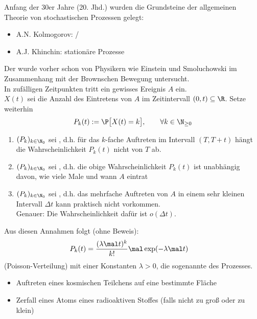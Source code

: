 Anfang der 30er Jahre (20. Jhd.) wurden die 
Grundsteine der allgemeinen Theorie von stochastischen Prozessen gelegt:
\begin{itemize}
	\item A.N. Kolmogorov:  / 
	\item A.J. Khinchin: stationäre Prozesse 
\end{itemize}

\begin{beisp}\enter
	Der  wurde vorher schon von Physikern wie Einstein und Smoluchowski im Zusammenhang mit der Brownschen Bewegung untersucht.\\
	In zufälligen Zeitpunkten tritt ein gewisses Ereignis $A$ ein.\\
	$X(t)$ sei die Anzahl des Eintretens von $A$ im Zeitintervall $(0,t)\subseteq\R$.
	Setze weiterhin
	\begin{align*}
		P_k(t):=\P\big[X(t)=k\big],\qquad\forall k\in\N_{\geq0}
	\end{align*}
	\begin{enumerate}
		\item $(P_k)_{k\in\N_0}$ sei , d.h. für das $k$-fache Auftreten im Intervall $(T,T+t)$ hängt die Wahrscheinlichkeit $P_k(t)$ nicht von $T$ ab.
		\item $(P_k)_{k\in\N_0}$ sei , d.h. die obige Wahrscheinlichkeit $P_k(t)$ ist unabhängig davon, wie viele Male und wann $A$  eintrat
		\item $(P_k)_{k\in\N_0}$ sei , d.h. das mehrfache Auftreten von $A$ in einem sehr kleinen Intervall $\Delta t$ kann praktisch nicht vorkommen.\\
		Genauer:
		Die Wahrscheinlichkeit dafür ist $o(\Delta t)$.
	\end{enumerate}
	 Aus diesen Annahmen folgt (ohne Beweis):
	 \begin{align*}
	 	P_k(t)&=\frac{(\lambda\mal t)^k}{k!}\mal\exp(-\lambda\mal t)
	 \end{align*}
	 (Poisson-Verteilung) mit einer Konstanten $\lambda>0$, die sogenannte  des Prozesses.\nl
	 \begin{itemize}
	 	\item Auftreten eines kosmischen Teilchens auf eine  bestimmte Fläche
	 	\item Zerfall eines Atoms eines radioaktiven Stoffes
	 	(falls nicht zu groß oder zu klein)
	 \end{itemize}
\end{beisp}

